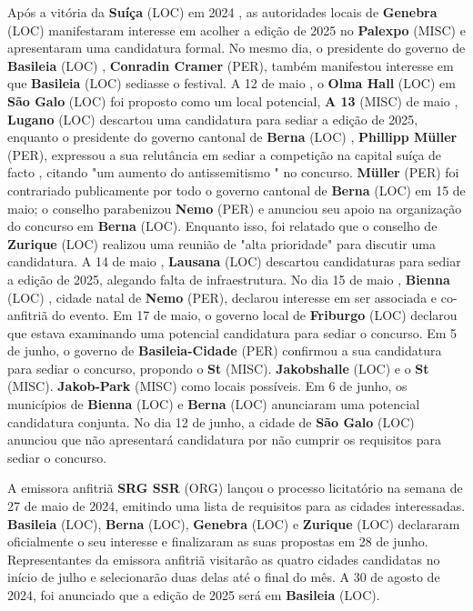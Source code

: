\documentclass[12pt,a4paper]{article}
\begin{document}
Após a vitória da \textbf{Suíça} (LOC) em 2024 , as autoridades locais de \textbf{Genebra} (LOC) manifestaram interesse em acolher a edição de 2025 no \textbf{Palexpo} (MISC) e apresentaram uma candidatura formal. No mesmo dia, o presidente do governo de \textbf{Basileia} (LOC) , \textbf{Conradin Cramer} (PER), também manifestou interesse em que \textbf{Basileia} (LOC) sediasse o festival. A 12 de maio , o \textbf{Olma Hall} (LOC) em \textbf{São Galo} (LOC) foi proposto como um local potencial, \textbf{A 13} (MISC) de maio , \textbf{Lugano} (LOC) descartou uma candidatura para sediar a edição de 2025, enquanto o presidente do governo cantonal de \textbf{Berna} (LOC) , \textbf{Phillipp Müller} (PER), expressou a sua relutância em sediar a competição na capital suíça de facto , citando "um aumento do antissemitismo " no concurso. \textbf{Müller} (PER) foi contrariado publicamente por todo o governo cantonal de \textbf{Berna} (LOC) em 15 de maio; o conselho parabenizou \textbf{Nemo} (PER) e anunciou seu apoio na organização do concurso em \textbf{Berna} (LOC). Enquanto isso, foi relatado que o conselho de \textbf{Zurique} (LOC) realizou uma reunião de "alta prioridade" para discutir uma candidatura. A 14 de maio , \textbf{Lausana} (LOC) descartou candidaturas para sediar a edição de 2025, alegando falta de infraestrutura. No dia 15 de maio , \textbf{Bienna} (LOC) , cidade natal de \textbf{Nemo} (PER), declarou interesse em ser associada e co-anfitriã do evento. Em 17 de maio, o governo local de \textbf{Friburgo} (LOC) declarou que estava examinando uma potencial candidatura para sediar o concurso. Em 5 de junho, o governo de \textbf{Basileia-Cidade} (PER) confirmou a sua candidatura para sediar o concurso, propondo o \textbf{St} (MISC). \textbf{Jakobshalle} (LOC) e o \textbf{St} (MISC). \textbf{Jakob-Park} (MISC) como locais possíveis. Em 6 de junho, os municípios de \textbf{Bienna} (LOC) e \textbf{Berna} (LOC) anunciaram uma potencial candidatura conjunta. No dia 12 de junho, a cidade de \textbf{São Galo} (LOC) anunciou que não apresentará candidatura por não cumprir os requisitos para sediar o concurso.

A emissora anfitriã \textbf{SRG SSR} (ORG) lançou o processo licitatório na semana de 27 de maio de 2024, emitindo uma lista de requisitos para as cidades interessadas. \textbf{Basileia} (LOC), \textbf{Berna} (LOC), \textbf{Genebra} (LOC) e \textbf{Zurique} (LOC) declararam oficialmente o seu interesse e finalizaram as suas propostas em 28 de junho. Representantes da emissora anfitriã visitarão as quatro cidades candidatas no início de julho e selecionarão duas delas até o final do mês. A 30 de agosto de 2024, foi anunciado que a edição de 2025 será em \textbf{Basileia} (LOC).
\end{document}
